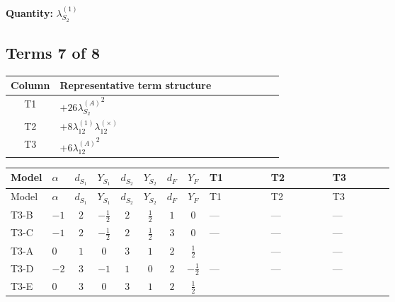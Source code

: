 \documentclass[8pt]{article}
\begin{document}
\begin{landscape}
\begin{longtable}{@{}llcccccc >{\raggedright\arraybackslash}p{0.21\linewidth} >{\raggedright\arraybackslash}p{0.21\linewidth} >{\raggedright\arraybackslash}p{0.21\linewidth}@{}}
\midrule
\bottomrule
\end{longtable}
\clearpage
\noindent\textbf{Quantity: }$\lambda_{S_2}^{(1)}$\par\smallskip
\subsection*{Terms 7 of 8}
\begin{center}
\begin{tabular}{@{}c >{\raggedright\arraybackslash}p{0.82\linewidth}@{}}
\toprule
Column & Representative term structure \\
\midrule
T1 & \(\displaystyle +26 {\lambda_{S_2}^{(A)}}^2\) \\
\midrule
T2 & \(\displaystyle +8 {\lambda_{12}^{(1)}} {\lambda_{12}^{(\times)}}\) \\
\midrule
T3 & \(\displaystyle +6 {\lambda_{12}^{(A)}}^2\) \\
\midrule
\bottomrule
\end{tabular}
\end{center}
\smallskip
\tiny
\begin{longtable}{@{}llcccccc >{\raggedright\arraybackslash}p{0.21\linewidth} >{\raggedright\arraybackslash}p{0.21\linewidth} >{\raggedright\arraybackslash}p{0.21\linewidth}@{}}
\toprule
Model & $\alpha$ & $d_{S_1}$ & $Y_{S_1}$ & $d_{S_2}$ & $Y_{S_2}$ & $d_F$ & $Y_F$ & T1 & T2 & T3 \\
\midrule
\endfirsthead
\toprule
Model & $\alpha$ & $d_{S_1}$ & $Y_{S_1}$ & $d_{S_2}$ & $Y_{S_2}$ & $d_F$ & $Y_F$ & T1 & T2 & T3 \\
\midrule
\endhead
T3-B & $-1$ & $2$ & $-\frac{1}{2}$ & $2$ & $\frac{1}{2}$ & $1$ & $0$ & --- & --- & --- \\
\midrule
T3-C & $-1$ & $2$ & $-\frac{1}{2}$ & $2$ & $\frac{1}{2}$ & $3$ & $0$ & --- & --- & --- \\
\midrule
T3-A & $0$ & $1$ & $0$ & $3$ & $1$ & $2$ & $\frac{1}{2}$ & \scriptsize\adjustbox{max width=\linewidth}{$\begin{gathered} +26 {\lambda_{S_2}^{(A)}}^2\end{gathered}$} & --- & --- \\
\midrule
T3-D & $-2$ & $3$ & $-1$ & $1$ & $0$ & $2$ & $-\frac{1}{2}$ & --- & --- & --- \\
\midrule
T3-E & $0$ & $3$ & $0$ & $3$ & $1$ & $2$ & $\frac{1}{2}$ & \scriptsize\adjustbox{max width=\linewidth}{$\begin{gathered} +26 {\lambda_{S_2}^{(A)}}^2\end{gathered}$} & \scriptsize\adjustbox{max width=\linewidth}{$\begin{gathered} +8 {\lambda_{12}^{(1)}} {\lambda_{12}^{(\times)}}\end{gathered}$} & \scriptsize\adjustbox{max width=\linewidth}{$\begin{gathered} +6 {\lambda_{12}^{(A)}}^2\end{gathered}$} \\

\end{longtable}
\end{landscape}
\end{document}
